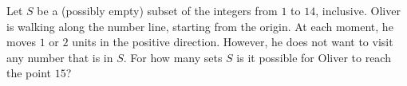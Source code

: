 Let $S$ be a (possibly empty) subset of the integers from $1$ to $14$, inclusive. Oliver is walking along the number line, starting from the origin. At each moment, he moves $1$ or $2$ units in the positive direction. However, he does not want to visit any number that is in $S$. For how many sets $S$ is it possible for Oliver to reach the point $15$?

